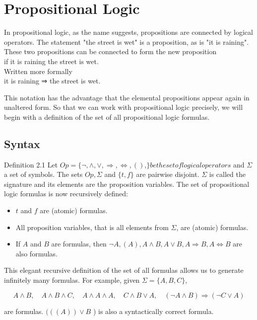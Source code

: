\documentclass[10pt]{book}
\begin{document}
\section*{Propositional Logic}
In propositional logic, as the name suggests, propositions are connected by logical operators. The statement "the street is wet" is a proposition, as is "it is raining". These two propositions can be connected to form the new proposition\\
if it is raining the street is wet.\\
Written more formally\\
it is raining ⇒ the street is wet.

This notation has the advantage that the elemental propositions appear again in unaltered form. So that we can work with propositional logic precisely, we will begin with a definition of the set of all propositional logic formulas.

\subsection*{Syntax}
Definition 2.1 Let $O p=\{\neg, \wedge, \vee, \Rightarrow, \Leftrightarrow,()$,$\} be the set of logical operators$ and $\Sigma$ a set of symbols. The sets $O p, \Sigma$ and $\{t, f\}$ are pairwise disjoint. $\Sigma$ is called the signature and its elements are the proposition variables. The set of propositional logic formulas is now recursively defined:

\begin{itemize}
  \item $t$ and $f$ are (atomic) formulas.
  \item All proposition variables, that is all elements from $\Sigma$, are (atomic) formulas.
  \item If $A$ and $B$ are formulas, then $\neg A,(A), A \wedge B, A \vee B, A \Rightarrow B, A \Leftrightarrow B$ are also formulas.
\end{itemize}

This elegant recursive definition of the set of all formulas allows us to generate infinitely many formulas. For example, given $\Sigma=\{A, B, C\}$,

$$
A \wedge B, \quad A \wedge B \wedge C, \quad A \wedge A \wedge A, \quad C \wedge B \vee A, \quad(\neg A \wedge B) \Rightarrow(\neg C \vee A)
$$

are formulas. $(((A)) \vee B$ ) is also a syntactically correct formula.
\end{document}
